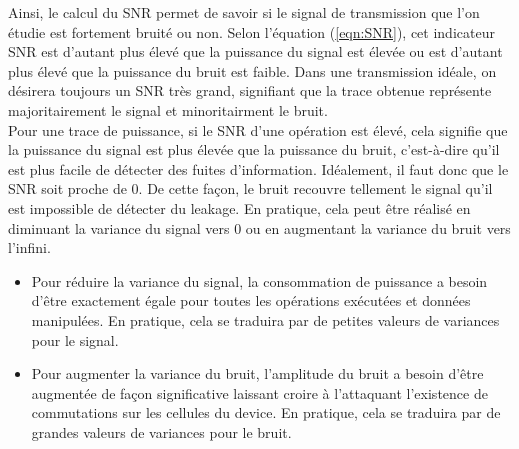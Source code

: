 \documentclass[10pt, oneside, a4paper]{article}
\begin{document}
\vspace{-0.2 cm}Ainsi, le calcul du SNR permet de savoir si le signal de transmission que l'on étudie est fortement bruité ou non. Selon l'équation (\ref{eqn:SNR}), cet indicateur SNR est d'autant plus élevé que la puissance du signal est élevée ou est d'autant plus élevé que la puissance du bruit est faible. Dans une transmission idéale, on désirera toujours un SNR très grand, signifiant que la trace obtenue représente majoritairement le signal et minoritairment le bruit. \\
Pour une trace de puissance, si le SNR d'une opération est élevé, cela signifie que la puissance du signal est plus élevée que la puissance du bruit, c'est-à-dire qu'il est plus facile de détecter des fuites d'information. Idéalement, il faut donc que le SNR soit proche de 0. De cette façon, le bruit recouvre tellement le signal qu'il est impossible de détecter du leakage. En pratique, cela peut être réalisé en diminuant la variance du signal vers 0 ou en augmentant la variance du bruit vers l'infini.
\begin{itemize}
\item Pour réduire la variance du signal, la consommation de puissance a besoin d'être exactement égale pour toutes les opérations exécutées et données manipulées. En pratique, cela se traduira par de petites valeurs de variances pour le signal.
\item Pour augmenter la variance du bruit, l'amplitude du bruit a besoin d'être augmentée de façon significative laissant croire à l'attaquant l'existence de commutations sur les cellules du device. En pratique, cela se traduira par de grandes valeurs de variances pour le bruit.
\end{itemize}

\newpage
\end{document}
